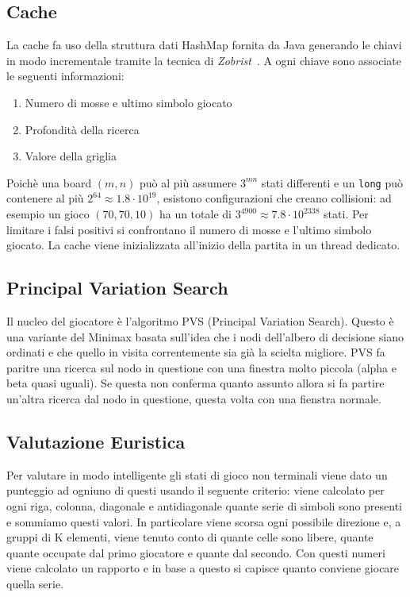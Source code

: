 \documentclass{article}
\begin{document}
\subsection{Cache}
La cache fa uso della struttura dati HashMap fornita da Java generando le chiavi 
in modo incrementale tramite la tecnica di \emph{Zobrist}~\cite{zobrist}. A ogni
chiave sono associate le seguenti informazioni:
\begin{enumerate}
  \item Numero di mosse e ultimo simbolo giocato
  \item Profondit\`a della ricerca
  \item Valore della griglia
\end{enumerate}
Poich\`e una board $(m,n)$ pu\`o al pi\`u assumere $3^{mn}$ stati differenti e
un \verb!long! pu\`o contenere al pi\`u $2^{64} \approx 1.8 \cdot 10^{19}$,
esistono configurazioni che creano collisioni: ad esempio un gioco $(70, 70, 10)$
ha un totale di $3^{4900} \approx 7.8 \cdot 10^{2338}$ stati. Per limitare i
falsi positivi si confrontano il numero di mosse e l'ultimo simbolo giocato.
La cache viene inizializzata all'inizio della partita in un thread dedicato.


\subsection{Principal Variation Search}
Il nucleo del giocatore è l'algoritmo PVS (Principal Variation Search). Questo è 
una variante del Minimax basata sull'idea che i nodi dell'albero di decisione 
siano ordinati e che quello in visita correntemente sia gi\`a la scielta migliore.
PVS fa paritre una ricerca sul nodo in questione con una finestra molto piccola 
(alpha e beta quasi uguali). Se questa non conferma quanto assunto allora si fa
partire un'altra ricerca dal nodo in questione, questa volta con una fienstra 
normale.

\subsection{Valutazione Euristica}
Per valutare in modo intelligente gli stati di gioco non terminali viene dato un 
punteggio ad ogniuno di questi usando il seguente criterio: viene calcolato per
ogni riga, colonna, diagonale e antidiagonale quante serie di simboli sono presenti
e sommiamo questi valori. In particolare viene scorsa ogni possibile direzione e,
a gruppi di K elementi, viene tenuto conto di quante celle sono libere, quante
quante occupate dal primo giocatore e quante dal secondo. Con questi numeri viene 
calcolato un rapporto e in base a questo si capisce quanto conviene giocare 
quella serie.

\pagebreak


\end{document}
